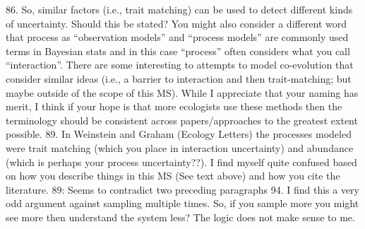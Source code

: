86.  So, similar factors (i.e., trait matching) can be used to detect different kinds of uncertainty.  Should this be stated?  You might also consider a different word that process as “observation models” and “process models” are commonly used terms in Bayesian stats and in this case “process” often considers what you call “interaction”.  There are some interesting to attempts to model co-evolution that consider similar ideas (i.e., a barrier to interaction and then trait-matching; but maybe outside of the scope of this MS). While I appreciate that your naming has merit, I think if your hope is that more ecologists use these methods then the terminology should be consistent across papers/approaches to the greatest extent possible.
89.  In Weinstein and Graham (Ecology Letters) the processes modeled were trait matching (which you place in interaction uncertainty) and abundance (which is perhaps your process uncertainty??).  I find myself quite confused based on how you describe things in this MS (See text above) and how you cite the literature.
89: Seems to contradict two preceding paragraphs
94.  I find this a very odd argument against sampling multiple times.  So, if you sample more you might see more then understand the system less?  The logic does not make sense to me. 

